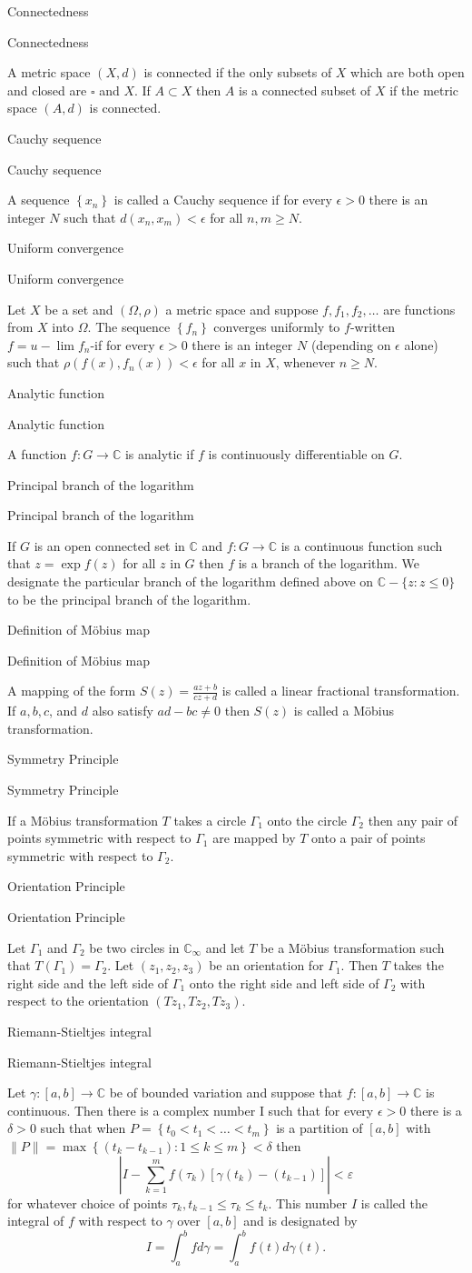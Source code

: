 \documentclass[17pt]{extarticle}
\newcommand{\C}{\mathbb{C}}
\newcommand{\abs}[1]{\left\vert#1\right\vert}
\newcommand{\LP}{\left(}
\newcommand{\RP}{\right)}
\newcommand{\LB}{\left[}
\newcommand{\RB}{\right]}
\newcommand{\boxset}[2]{\begin{mdframed}[style=darkQuesion]
  #1
    \end{mdframed}
    \newpage
    \begin{mdframed}[style=darkQuesion]
      #1
        \end{mdframed}
    \begin{mdframed}[style=darkAnswer]
      #2
        \end{mdframed}
        \newpage
  }
\begin{document}
\par
\newpage
\boxset{Connectedness}
{ A metric space $(X, d)$ is connected if the only subsets of $X$ which are both open and closed are $\square$ and $X$. If $A \subset X$ then $A$ is a connected subset of $X$ if the metric space $(A, d)$ is connected.}
\boxset{Cauchy sequence}
{ A sequence $\left\{x_{n}\right\}$ is called a Cauchy sequence if for every $\epsilon>0$ there is an integer $N$ such that $d\left(x_{n}, x_{m}\right)<\epsilon$ for all $n, m \geq N$.}
\boxset{Uniform convergence}
{Let $X$ be a set and $(\Omega, \rho)$ a metric space and suppose $f, f_{1}, f_{2}, \ldots$ are functions from $X$ into $\Omega$. The sequence $\left\{f_{n}\right\}$ converges uniformly to $f$-written $f=u-\lim f_{n}$-if for every $\epsilon>0$ there is an integer $N$ (depending on $\epsilon$ alone) such that $\rho\left(f(x), f_{n}(x)\right)<\epsilon$ for all $x$ in $X$, whenever $n \geq N$.}
\boxset{Analytic function}
{ A function $f: G \rightarrow \C$ is analytic if $f$ is continuously differentiable on $G$.}
\boxset{Principal branch of the logarithm}
{ If $G$ is an open connected set in $\C$ and $f: G \rightarrow \C$ is a continuous function such that $z=\exp f(z)$ for all $z$ in $G$ then $f$ is a branch of the logarithm.
We designate the particular branch of the logarithm defined above on $\C-\{z: z \leq 0\}$ to be the principal branch of the logarithm.}
\boxset{Definition of Möbius map}
{ A mapping of the form $S(z)=\frac{a z+b}{c z+d}$ is called a linear fractional transformation. If $a, b, c$, and $d$ also satisfy $a d-b c \neq 0$ then $S(z)$ is called a Möbius transformation.}
\boxset{Symmetry Principle}
{ If a Möbius transformation $T$ takes a circle $\Gamma_{1}$ onto the circle $\Gamma_{2}$ then any pair of points symmetric with respect to $\Gamma_{1}$ are mapped by $T$ onto a pair of points symmetric with respect to $\Gamma_{2}$.}
\boxset{Orientation Principle}
{ Let $\Gamma_{1}$ and $\Gamma_{2}$ be two circles in $\C_{\infty}$ and let $T$ be a Möbius transformation such that $T\left(\Gamma_{1}\right)=\Gamma_{2}$. Let $\left(z_{1}, z_{2}, z_{3}\right)$ be an orientation for $\Gamma_{1}$. Then $T$ takes the right side and the left side of $\Gamma_{1}$ onto the right side and left side of $\Gamma_{2}$ with respect to the orientation $\left(T z_{1}, T z_{2}, T z_{3}\right)$.}
\boxset{Riemann-Stieltjes integral}
{ Let $\gamma:[a, b] \rightarrow \C$ be of bounded variation and suppose that $f:[a, b] \rightarrow \C$ is continuous. Then there is a complex number I such that for every $\epsilon>0$ there is a $\delta>0$ such that when $P=\left\{t_{0}<t_{1}<\ldots<t_{m}\right\}$ is a partition of $[a, b]$ with $\|P\|=\max \left\{\left(t_{k}-t_{k-1}\right): 1 \leq k \leq m\right\}<\delta$ then
\[\abs{I-\sum_{k=1}^m f\LP\tau_k\RP\LB\gamma\LP t_k\RP-\LP t_{k-1}\RP\RB}<\varepsilon\]
for whatever choice of points $\tau_{k}, t_{k-1} \leq \tau_{k} \leq t_{k}$.
This number $I$ is called the integral of $f$ with respect to $\gamma$ over $[a, b]$ and is designated by
\[I=\int_{a}^{b} f d \gamma=\int_{a}^{b} f(t) d \gamma(t) .\]
}
\end{document}
